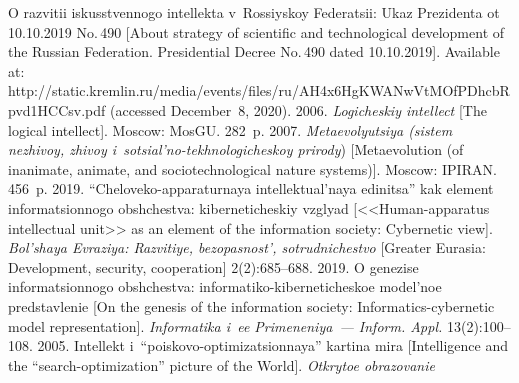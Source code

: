 


\vspace*{6pt}

\begin{multicols}{2}

\renewcommand{\bibname}{\protect\rmfamily References}

{\small\frenchspacing
{%
\begin{thebibliography}{99}
O razvitii iskusstvennogo intellekta v~Rossiyskoy Federatsii: Ukaz 
Prezidenta ot 10.10.2019 No.\,490 [About strategy of scientific and 
technological development of the Russian Federation. Presidential Decree 
No.\,490 dated 10.10.2019]. Available at: {\sf 
http://static.kremlin.ru/\linebreak media/events/files/ru/AH4x6HgKWANwVtMOfPDhcb\linebreak Rpvd1HCCsv.pdf} (accessed 
December~8, 2020).
 2006. \textit{Logicheskiy intellect} [The logical 
intellect]. Moscow: MosGU. 282~p.
 2007. \textit{Metaevolyutsiya (sistem nezhivoy, 
zhivoy i~sotsial'no-tekhnologicheskoy prirody}) [Metaevolution (of 
inanimate, animate, and sociotechnological nature systems)]. Moscow: 
IPIRAN. 456~p.
 2019. ``Cheloveko-apparaturnaya\linebreak 
intellektual'naya edinitsa'' kak element informatsionnogo obshchestva: 
kiberneticheskiy vzglyad [<<Human-apparatus intellectual unit>> as an 
element of the information society: Cybernetic view]. \textit{Bol'shaya 
Evraziya: Razvitiye, bezopasnost', sotrudnichestvo} [Greater Eurasia: 
Development, security, cooperation] 2(2):685--688.
 2019. O genezise informatsionnogo 
obshchestva: informatiko-kiberneticheskoe model'noe predstavlenie 
[On the genesis of the information society: Informatics-cybernetic model 
representation]. \textit{Informatika i~ee Primeneniya~--- Inform. Appl.} 
13(2):100--108.
 2005. Intellekt  
i~``poiskovo-optimizatsionnaya'' kartina mira [Intelligence and the 
``search-optimization'' picture of the World]. \textit{Otkrytoe obrazovanie} 

\end{thebibliography}}}
\end{multicols}

